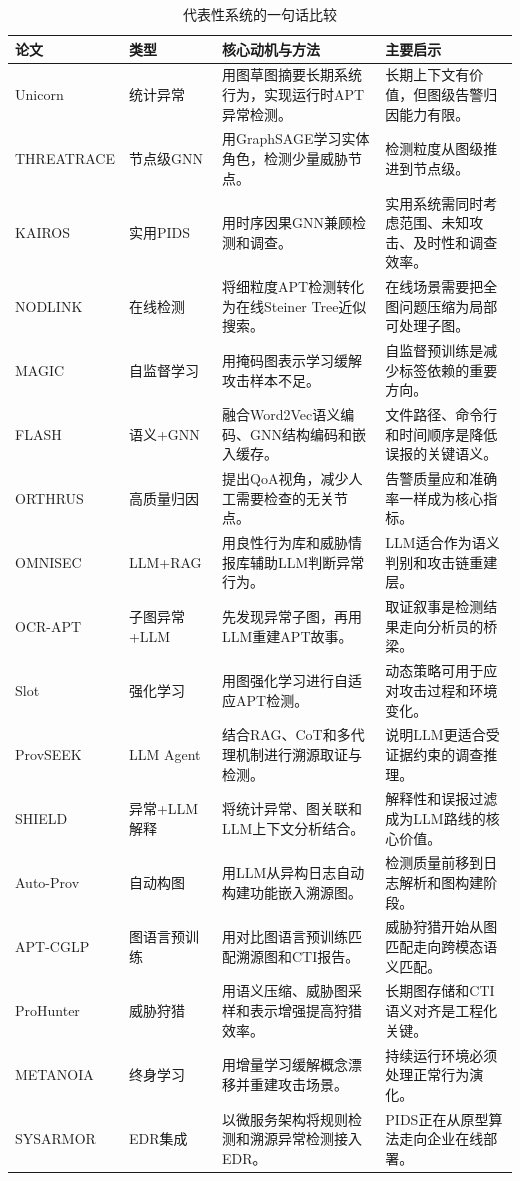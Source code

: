 \begin{table}[htbp]
    \centering
    \scriptsize
    \caption{代表性系统的一句话比较}
    \label{tab:papers}
    \renewcommand{\arraystretch}{1.05}
    \begin{tabularx}{\textwidth}{p{1.85cm} p{1.75cm} X X}
        \toprule
        论文 & 类型 & 核心动机与方法 & 主要启示 \\
        \midrule
        Unicorn & 统计异常 & 用图草图摘要长期系统行为，实现运行时APT异常检测。 & 长期上下文有价值，但图级告警归因能力有限。 \\
        THREATRACE & 节点级GNN & 用GraphSAGE学习实体角色，检测少量威胁节点。 & 检测粒度从图级推进到节点级。 \\
        KAIROS & 实用PIDS & 用时序因果GNN兼顾检测和调查。 & 实用系统需同时考虑范围、未知攻击、及时性和调查效率。 \\
        NODLINK & 在线检测 & 将细粒度APT检测转化为在线Steiner Tree近似搜索。 & 在线场景需要把全图问题压缩为局部可处理子图。 \\
        MAGIC & 自监督学习 & 用掩码图表示学习缓解攻击样本不足。 & 自监督预训练是减少标签依赖的重要方向。 \\
        FLASH & 语义+GNN & 融合Word2Vec语义编码、GNN结构编码和嵌入缓存。 & 文件路径、命令行和时间顺序是降低误报的关键语义。 \\
        ORTHRUS & 高质量归因 & 提出QoA视角，减少人工需要检查的无关节点。 & 告警质量应和准确率一样成为核心指标。 \\
        OMNISEC & LLM+RAG & 用良性行为库和威胁情报库辅助LLM判断异常行为。 & LLM适合作为语义判别和攻击链重建层。 \\
        OCR-APT & 子图异常+LLM & 先发现异常子图，再用LLM重建APT故事。 & 取证叙事是检测结果走向分析员的桥梁。 \\
        Slot & 强化学习 & 用图强化学习进行自适应APT检测。 & 动态策略可用于应对攻击过程和环境变化。 \\
        ProvSEEK & LLM Agent & 结合RAG、CoT和多代理机制进行溯源取证与检测。 & 说明LLM更适合受证据约束的调查推理。 \\
        SHIELD & 异常+LLM解释 & 将统计异常、图关联和LLM上下文分析结合。 & 解释性和误报过滤成为LLM路线的核心价值。 \\
        Auto-Prov & 自动构图 & 用LLM从异构日志自动构建功能嵌入溯源图。 & 检测质量前移到日志解析和图构建阶段。 \\
        APT-CGLP & 图语言预训练 & 用对比图语言预训练匹配溯源图和CTI报告。 & 威胁狩猎开始从图匹配走向跨模态语义匹配。 \\
        ProHunter & 威胁狩猎 & 用语义压缩、威胁图采样和表示增强提高狩猎效率。 & 长期图存储和CTI语义对齐是工程化关键。 \\
        METANOIA & 终身学习 & 用增量学习缓解概念漂移并重建攻击场景。 & 持续运行环境必须处理正常行为演化。 \\
        SYSARMOR & EDR集成 & 以微服务架构将规则检测和溯源异常检测接入EDR。 & PIDS正在从原型算法走向企业在线部署。 \\
        \bottomrule
    \end{tabularx}
\end{table}

